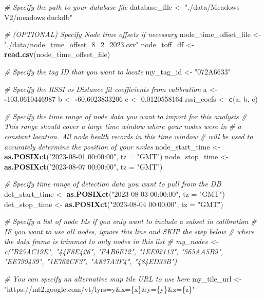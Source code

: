 \documentclass[
]{book}
\newenvironment{Shaded}{\begin{snugshade}}{\end{snugshade}}
\newcommand{\AttributeTok}[1]{\textcolor[rgb]{0.13,0.29,0.53}{#1}}
\newcommand{\CommentTok}[1]{\textcolor[rgb]{0.56,0.35,0.01}{\textit{#1}}}
\newcommand{\FloatTok}[1]{\textcolor[rgb]{0.00,0.00,0.81}{#1}}
\newcommand{\FunctionTok}[1]{\textcolor[rgb]{0.13,0.29,0.53}{\textbf{#1}}}
\newcommand{\NormalTok}[1]{#1}
\newcommand{\OtherTok}[1]{\textcolor[rgb]{0.56,0.35,0.01}{#1}}
\newcommand{\SpecialCharTok}[1]{\textcolor[rgb]{0.81,0.36,0.00}{\textbf{#1}}}
\newcommand{\StringTok}[1]{\textcolor[rgb]{0.31,0.60,0.02}{#1}}
\begin{document}
\begin{Shaded}
\begin{Highlighting}[]
\CommentTok{\# Specify the path to your database file}
\NormalTok{database\_file }\OtherTok{\textless{}{-}} \StringTok{"./data/Meadows V2/meadows.duckdb"}

\CommentTok{\# (OPTIONAL) Specify Node time offsets if necessary}
\NormalTok{node\_time\_offset\_file }\OtherTok{\textless{}{-}} \StringTok{"./data/node\_time\_offset\_8\_2\_2023.csv"}
\NormalTok{node\_toff\_df }\OtherTok{\textless{}{-}} \FunctionTok{read.csv}\NormalTok{(node\_time\_offset\_file)}

\CommentTok{\# Specify the tag ID that you want to locate}
\NormalTok{my\_tag\_id }\OtherTok{\textless{}{-}} \StringTok{"072A6633"}

\CommentTok{\# Specify the RSSI vs Distance fit coefficients from calibration}
\NormalTok{a }\OtherTok{\textless{}{-}} \SpecialCharTok{{-}}\FloatTok{103.0610446987}
\NormalTok{b }\OtherTok{\textless{}{-}} \SpecialCharTok{{-}}\FloatTok{60.6023833206}
\NormalTok{c }\OtherTok{\textless{}{-}} \FloatTok{0.0120558164}
\NormalTok{rssi\_coefs }\OtherTok{\textless{}{-}} \FunctionTok{c}\NormalTok{(a, b, c)}

\CommentTok{\# Specify the time range of node data you want to import for this analysis}
\CommentTok{\#   This range should cover a large time window where your nodes were in}
\CommentTok{\#   a constant location.  All node health records in this time window}
\CommentTok{\#   will be used to accurately determine the position of your nodes}
\NormalTok{node\_start\_time }\OtherTok{\textless{}{-}} \FunctionTok{as.POSIXct}\NormalTok{(}\StringTok{"2023{-}08{-}01 00:00:00"}\NormalTok{, }\AttributeTok{tz =} \StringTok{"GMT"}\NormalTok{)}
\NormalTok{node\_stop\_time }\OtherTok{\textless{}{-}} \FunctionTok{as.POSIXct}\NormalTok{(}\StringTok{"2023{-}08{-}07 00:00:00"}\NormalTok{, }\AttributeTok{tz =} \StringTok{"GMT"}\NormalTok{)}

\CommentTok{\# Specify time range of detection data you want to pull from the DB}
\NormalTok{det\_start\_time }\OtherTok{\textless{}{-}} \FunctionTok{as.POSIXct}\NormalTok{(}\StringTok{"2023{-}08{-}03 00:00:00"}\NormalTok{, }\AttributeTok{tz =} \StringTok{"GMT"}\NormalTok{)}
\NormalTok{det\_stop\_time }\OtherTok{\textless{}{-}} \FunctionTok{as.POSIXct}\NormalTok{(}\StringTok{"2023{-}08{-}04 00:00:00"}\NormalTok{, }\AttributeTok{tz =} \StringTok{"GMT"}\NormalTok{)}

\CommentTok{\# Specify a list of node Ids if you only want to include a subset in calibration}
\CommentTok{\# IF you want to use all nodes, ignore this line and SKIP the step below}
\CommentTok{\# where the data frame is trimmed to only nodes in this list}
\CommentTok{\# my\_nodes \textless{}{-} c("B25AC19E", "44F8E426", "FAB6E12", "1EE02113", "565AA5B9", "EE799439", "1E762CF3", "A837A3F4", "484ED33B")}

\CommentTok{\# You can specify an alternative map tile URL to use here}
\NormalTok{my\_tile\_url }\OtherTok{\textless{}{-}} \StringTok{"https://mt2.google.com/vt/lyrs=y\&x=\{x\}\&y=\{y\}\&z=\{z\}"}
\end{Highlighting}
\end{Shaded}
\end{document}

